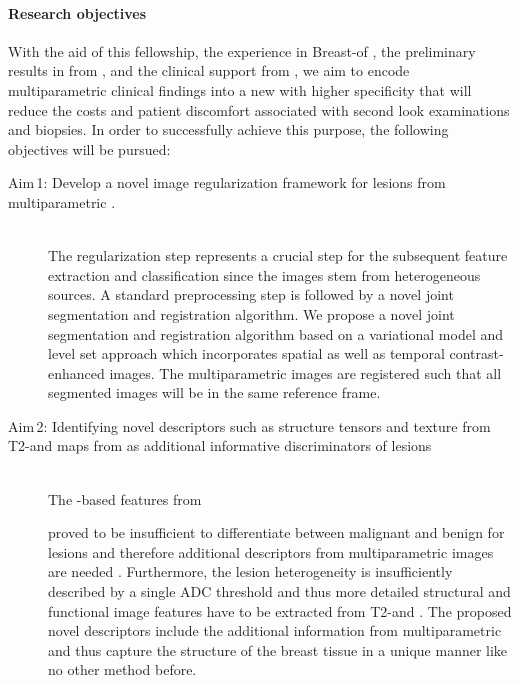 \paragraph{Research objectives}

With the aid of this fellowship, the experience in Breast-\cad of \vicorob, the preliminary results in \cemri from \florida, and the clinical support from \udiat, we aim to encode multiparametric \mri clinical findings into a new \cad with higher specificity that will reduce the costs and patient discomfort associated with second look examinations and biopsies.
In order to successfully achieve this purpose, the following objectives will be pursued:

\begin{description}
\item [Aim\,1: Develop a novel image regularization framework for \nmle lesions from multiparametric \mri.] \hfill \\
  The regularization step represents a crucial step for the subsequent feature
  extraction and classification since the images stem from heterogeneous
  sources. A standard preprocessing step is followed by a novel joint
  segmentation and registration algorithm. We propose a novel joint
  segmentation and registration algorithm based on a variational model and
  level set approach which incorporates spatial as well as temporal
  contrast-enhanced images.
  The multiparametric images are registered such that all segmented images will
  be in the same reference frame.

  \item [Aim\,2: Identifying novel descriptors such as structure tensors and texture from T2-\mri and \ivim maps from \dwi as additional informative discriminators of \nmle lesions] \hfill \\
    The \birads-based features from \cemri
    
    proved to be insufficient to differentiate between malignant and benign for
    \nmle lesions and therefore additional descriptors from multiparametric
    images are needed . Furthermore, the lesion heterogeneity is
    insufficiently described by a single ADC threshold
    and thus more detailed structural and functional image features have to be
    extracted from T2-\mri and \dwi. The proposed novel descriptors include the
    additional information from multiparametric \mri and thus capture the
    structure of the breast tissue in a unique manner like no other method
    before.


\end{description}
